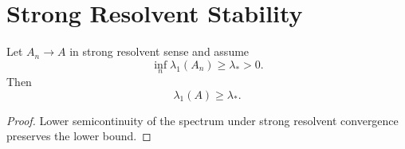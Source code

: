 \section{Strong Resolvent Stability}

\begin{theorem}
Let $A_n \to A$ in strong resolvent sense and assume
\[
\inf_n \lambda_1(A_n) \ge \lambda_* > 0.
\]
Then
\[
\lambda_1(A) \ge \lambda_*.
\]
\end{theorem}

\begin{proof}
Lower semicontinuity of the spectrum under strong resolvent convergence preserves the lower bound.
\end{proof}
